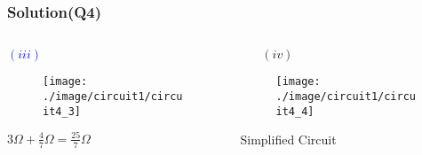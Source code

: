 \documentclass{beamer}
\newcommand{\blue}[1]{\textcolor{blue}{#1}}
\begin{document}
\begin{frame}
\frametitle{Solution(Q4)}
\begin{columns}
\begin{column}{6cm}

\blue{$(iii)$}
\begin{figure}[H]
  \label{epi_circuit4_3}
  \centering
  \texttt{[image: ./image/circuit1/circuit4\_3]}
\end{figure}
\begin{center} $3 \Omega + \frac{4}{7} \Omega = \frac{25}{7} \Omega$\end{center}
\end{column}
\begin{column}{6cm}
\begin{enumerate}[i]
  \item[$(iv)$]
\end{enumerate}
\begin{figure}[H]
  \label{epi_circuit4_4}
  \centering
  \texttt{[image: ./image/circuit1/circuit4\_4]}
\end{figure}
\center Simplified Circuit
\end{column}
\end{columns}
\end{frame}
\end{document}
